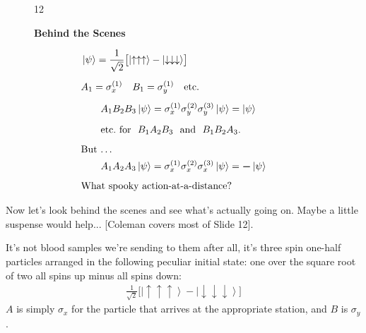 \documentclass[12pt,nofootinbib]{revtex4}
\newcommand{\bs}[1]{\boldsymbol{#1}}
\newcommand{\ket}[1]{\left|#1\right\rangle}
\newcommand{\up}{\uparrow}
\newcommand{\dw}{\downarrow}
\begin{document}
\begin{figure}[htb] 
\begin{mdframed}
  \vspace{5pt}\hfill 12\\[-18pt]
  \begin{center}
    \textbf{Behind the Scenes}
  \end{center}
  \vspace{-5pt}
  \begin{align}\nonumber
    &\hspace{-20pt}
    \ket{\psi}=\frac{1}{\sqrt{2}}
    \bigl[\ket{\up\up\up} - \ket{\dw\dw\dw}\bigr]\\[5pt]\nonumber
    &\hspace{-20pt}
    A_1=\sigma_x^{(1)}\quad B_1=\sigma_y^{(1)} \quad\text{etc.}\\[5pt]\nonumber 
    &%
    A_1B_2B_3\ket{\psi}
    =\sigma_x^{(1)}\sigma_y^{(2)}\sigma_y^{(3)}\ket{\psi}
    =\ket{\psi}\\[5pt]\nonumber 
    &%
    \text{etc.\ for\ \ $B_1A_2B_3$\ \ and\ \ $B_1B_2A_3$.}\\[5pt]\nonumber 
    &\hspace{-20pt}\text{But \ldots}\\[0pt]\nonumber
    &%
    A_1A_2A_3\ket{\psi}
    =\sigma_x^{(1)}\sigma_x^{(2)}\sigma_x^{(3)}\ket{\psi}
    =\bs{-}\ket{\psi}\\[5pt]\nonumber
    &\hspace{-20pt}\text{What spooky action-at-a-distance?}
  \end{align}
\vspace{-.5\baselineskip}
\end{mdframed}
\end{figure}
Now let's look behind the scenes and see what's actually going on.
Maybe a little suspense would help... [Coleman covers most of Slide 12].

It's not blood samples we're sending to them after all, it's three spin one-half particles arranged in the following peculiar initial state: one over the square root of two all spins up minus all spins down:
\begin{align}
  \frac{1}{\sqrt{2}}\bigl[\ket{\up\up\up} - \ket{\dw\dw\dw}\bigr]
\end{align}
$A$ is simply $\sigma_x$ for the particle that arrives at the appropriate station, and $B$ is $\sigma_y$.
\end{document}
